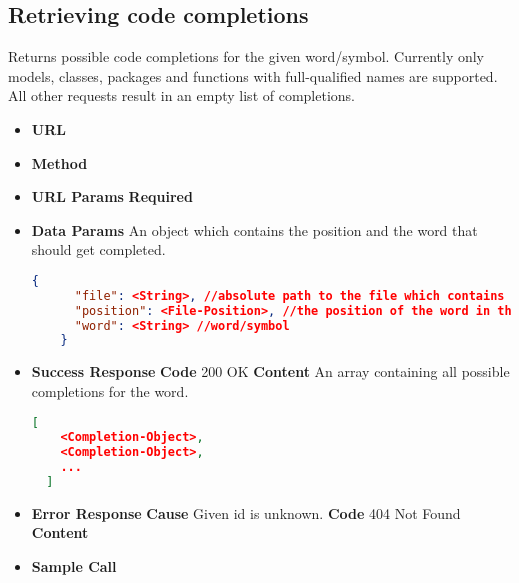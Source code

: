 \subsection{Retrieving code completions}
Returns possible code completions for the given word/symbol.
Currently only models, classes, packages and functions with full-qualified names are supported.
All other requests result in an empty list of completions.
\begin{itemize}
\item \textbf{URL} 
\item \textbf{Method} 

\item \textbf{URL Params}
  \newline\textbf{Required} 

\item \textbf{Data Params} An object which contains the position and the word that should get completed.
  \begin{lstlisting}[basicstyle=\small,language=json]
    {
      "file": <String>, //absolute path to the file which contains the word/symbol
      "position": <File-Position>, //the position of the word in the file
      "word": <String> //word/symbol
    }
  \end{lstlisting}

\item \textbf{Success Response}
  \newline\textbf{Code} 200 OK
  \newline\textbf{Content} An array containing all possible completions for the word.
  \begin{lstlisting}[basicstyle=\small,language=json]
  [
    <Completion-Object>,
    <Completion-Object>,
    ...
  ]
  \end{lstlisting}

\item \textbf{Error Response}
  \newline\textbf{Cause} Given id is unknown.
  \newline\textbf{Code} 404 Not Found
  \newline\textbf{Content} 

\item \textbf{Sample Call}
\end{itemize}
